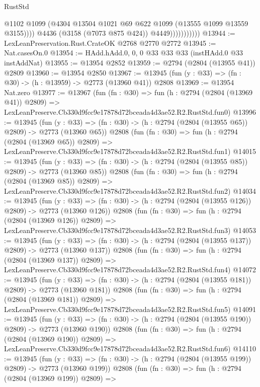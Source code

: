 \begin{lexlean}{RustStd}
\begin{coremodule}
                              @1102
                              @1099
                              (@4304 @13504 @1021 @69 @622 @1099 (@13555 @1099 @13559 @3155))))
                          @4436
                          (@3158 (@7073 @875 @424))
                          @4449)))))))))))
@13944 := LexLeanPreservation.Rust.CrateOK @2768 @2770 @2772
@13945 := Nat.casesOn.{0}
@13954 := HAdd.hAdd.{0, 0, 0} @33 @33 @33 (instHAdd.{0} @33 instAddNat)
@13955 := @13954 @2852
@13959 := @2794 (@2804 (@13955 @41)) @2809
@13960 := @13954 @2850
@13967 := @13945 (fun (y : @33) => (fn : @30) -> (h : @13959) -> @2773 (@13960 @41)) @2808
@13969 := @13954 Nat.zero
@13977 := @13967
    (fun (fn : @30) =>
    fun (h : @2794 (@2804 (@13969 @41)) @2809) =>
    LexLeanPreserve.Cb330d9fcc9e17878d72bceada4d3ae52.R2.RustStd.fun0)
@13996 := @13945
    (fun (y : @33) => (fn : @30) -> (h : @2794 (@2804 (@13955 @65)) @2809) -> @2773 (@13960 @65))
    @2808
    (fun (fn : @30) =>
    fun (h : @2794 (@2804 (@13969 @65)) @2809) =>
    LexLeanPreserve.Cb330d9fcc9e17878d72bceada4d3ae52.R2.RustStd.fun1)
@14015 := @13945
    (fun (y : @33) => (fn : @30) -> (h : @2794 (@2804 (@13955 @85)) @2809) -> @2773 (@13960 @85))
    @2808
    (fun (fn : @30) =>
    fun (h : @2794 (@2804 (@13969 @85)) @2809) =>
    LexLeanPreserve.Cb330d9fcc9e17878d72bceada4d3ae52.R2.RustStd.fun2)
@14034 := @13945
    (fun (y : @33) => (fn : @30) -> (h : @2794 (@2804 (@13955 @126)) @2809) -> @2773 (@13960 @126))
    @2808
    (fun (fn : @30) =>
    fun (h : @2794 (@2804 (@13969 @126)) @2809) =>
    LexLeanPreserve.Cb330d9fcc9e17878d72bceada4d3ae52.R2.RustStd.fun3)
@14053 := @13945
    (fun (y : @33) => (fn : @30) -> (h : @2794 (@2804 (@13955 @137)) @2809) -> @2773 (@13960 @137))
    @2808
    (fun (fn : @30) =>
    fun (h : @2794 (@2804 (@13969 @137)) @2809) =>
    LexLeanPreserve.Cb330d9fcc9e17878d72bceada4d3ae52.R2.RustStd.fun4)
@14072 := @13945
    (fun (y : @33) => (fn : @30) -> (h : @2794 (@2804 (@13955 @181)) @2809) -> @2773 (@13960 @181))
    @2808
    (fun (fn : @30) =>
    fun (h : @2794 (@2804 (@13969 @181)) @2809) =>
    LexLeanPreserve.Cb330d9fcc9e17878d72bceada4d3ae52.R2.RustStd.fun5)
@14091 := @13945
    (fun (y : @33) => (fn : @30) -> (h : @2794 (@2804 (@13955 @190)) @2809) -> @2773 (@13960 @190))
    @2808
    (fun (fn : @30) =>
    fun (h : @2794 (@2804 (@13969 @190)) @2809) =>
    LexLeanPreserve.Cb330d9fcc9e17878d72bceada4d3ae52.R2.RustStd.fun6)
@14110 := @13945
    (fun (y : @33) => (fn : @30) -> (h : @2794 (@2804 (@13955 @199)) @2809) -> @2773 (@13960 @199))
    @2808
    (fun (fn : @30) =>
    fun (h : @2794 (@2804 (@13969 @199)) @2809) =>

\end{coremodule}
\end{lexlean}
